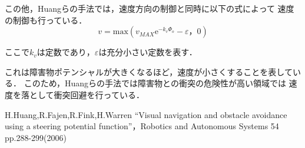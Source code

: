 \documentclass[10pt,a4j]{jarticle}
\begin{document}
この他，Huangらの手法では，速度方向の制御と同時に以下の式によって
速度の制御も行っている．
\begin{equation}
 v=\mathrm{max}(v_{MAX}\mathrm{e}^{-k_v\Phi_o}-\varepsilon，0) 
\end{equation}

ここで$k_vは定数であり，\varepsilon$は充分小さい定数を表す．

これは障害物ポテンシャルが大きくなるほど，速度が小さくすることを表している．
このため，Huangらの手法では障害物との衝突の危険性が高い領域では
速度を落として衝突回避を行っている．


\begin{thebibliography}{2}
  H.Huang,R.Fajen,R.Fink,H.Warren
``Visual navigation and obstacle avoidance using a steering potential 
function''，Robotics and Autonomous Systems 54 pp.288-299(2006)
\end{thebibliography}
\end{document}
